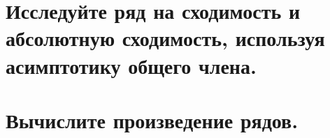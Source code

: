 \documentclass[a4paper,fleqn]{article}
\begin{document}




    
    \section*{Исследуйте ряд на сходимость и абсолютную сходимость, используя асимптотику общего члена.}





    
    \section*{Вычислите произведение рядов.}

\end{document}
